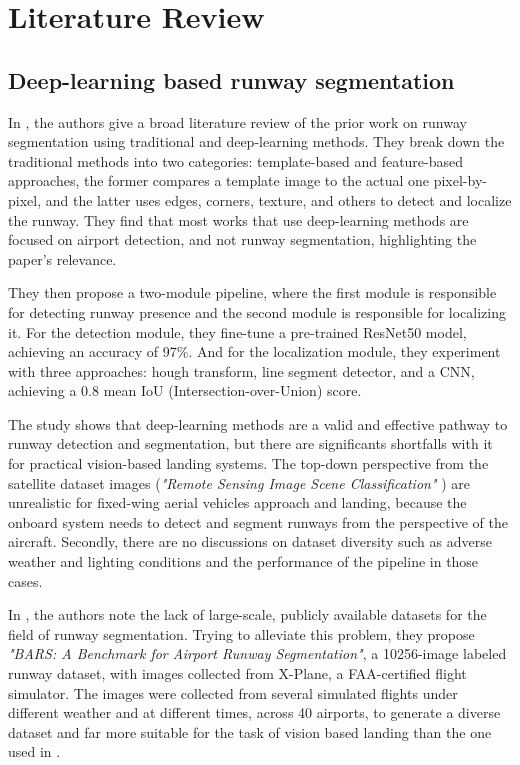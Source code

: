 \chapter{Literature Review}

\section{Deep-learning based runway segmentation}

In \cite{akbar_runway_2019}, the authors give a broad literature review of the
prior work on runway segmentation using traditional and deep-learning methods.
They break down the traditional methods into two categories: template-based and
feature-based approaches, the former compares a template image to the actual one
pixel-by-pixel, and the latter uses edges, corners, texture, and others to
detect and localize the runway. They find that most works that use deep-learning
methods are focused on airport detection, and not runway segmentation,
highlighting the paper's relevance.

They then propose a two-module pipeline, where the first module is responsible
for detecting runway presence and the second module is responsible for
localizing it. For the detection module, they fine-tune a pre-trained ResNet50 model, achieving an accuracy of 97\%. And for the localization module, they experiment with three approaches: hough transform, line segment detector, and a CNN, 
achieving a 0.8 mean IoU (Intersection-over-Union) score.

The study shows that deep-learning methods are a valid and effective pathway to
runway detection and segmentation, but there are significants shortfalls with it
for practical vision-based landing systems.  The top-down perspective from the
satellite dataset images (\emph{"Remote Sensing Image Scene Classification"} \cite{cheng_remote_2017}) are unrealistic for fixed-wing aerial vehicles approach and landing, because the onboard system needs to detect and segment runways from the perspective of the aircraft. Secondly, there are no discussions on dataset diversity such as adverse weather and lighting conditions and the performance of the pipeline in those cases.

In \cite{chen_bars_2023}, the authors note the lack of large-scale, publicly available datasets for the field of runway segmentation. Trying to alleviate this problem, they propose \emph{"BARS: A Benchmark for Airport Runway Segmentation"}, a 10256-image labeled runway dataset, with images collected from X-Plane, a FAA-certified flight simulator. The images were collected from several simulated flights under different weather and at different times, across 40 airports, to generate a diverse dataset and far more suitable for the task of vision based landing than the one used in \cite{akbar_runway_2019}.


